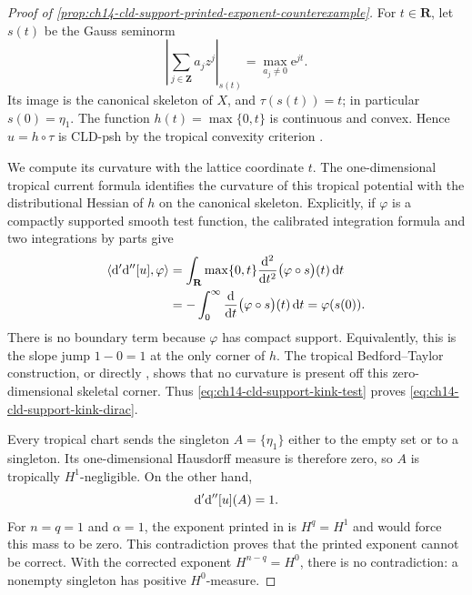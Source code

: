 \begin{proof}[Proof of
\cref{prop:ch14-cld-support-printed-exponent-counterexample}]
For $t\in\mathbf R$, let $s(t)$ be the Gauss seminorm
\[
 \left|\sum_{j\in\mathbf Z}a_jz^j\right|_{s(t)}
       =\max_{a_j\ne0}\mathrm e^{jt}.
\]
Its image is the canonical skeleton of $X$, and
$\tau(s(t))=t$; in particular $s(0)=\eta_1$.  The function
$h(t)=\max\{0,t\}$ is continuous and convex.  Hence
$u=h\circ\tau$ is CLD-psh by the tropical convexity criterion
\cite[Proposition~8.2.5]{CLD25}.

We compute its curvature with the lattice coordinate $t$.  The
one-dimensional tropical current formula identifies the curvature of this
tropical potential with the distributional Hessian of $h$ on the canonical
skeleton.  Explicitly, if $\varphi$ is a compactly supported smooth test
function, the calibrated integration formula and two integrations by parts
give
\begin{align}
 \left\langle\mathrm d'\mathrm d''[u],\varphi\right\rangle
   &=\int_{\mathbf R}\max\{0,t\}
           \frac{\mathrm d^2}{\mathrm dt^2}
             \bigl(\varphi\circ s\bigr)(t)\,\mathrm dt \notag\\
   &=-\int_0^\infty
           \frac{\mathrm d}{\mathrm dt}
             \bigl(\varphi\circ s\bigr)(t)\,\mathrm dt
     =\varphi(s(0)).
\label{eq:ch14-cld-support-kink-test}
\end{align}
There is no boundary term because $\varphi$ has compact support.  Equivalently,
this is the slope jump $1-0=1$ at the only corner of $h$.  The tropical
Bedford--Taylor construction, or directly
\cite[Theorem~8.10.3]{CLD25}, shows that no curvature is present off this
zero-dimensional skeletal corner.  Thus
\eqref{eq:ch14-cld-support-kink-test} proves
\eqref{eq:ch14-cld-support-kink-dirac}.

Every tropical chart sends the singleton $A=\{\eta_1\}$ either to the empty
set or to a singleton.  Its one-dimensional Hausdorff measure is therefore
zero, so $A$ is tropically $H^1$-negligible.  On the other hand,
\[
                    \mathrm d'\mathrm d''[u](A)=1.
\]
For $n=q=1$ and $\alpha=1$, the exponent printed in
\cite[Corollary~16.8.6]{CLD25} is $H^q=H^1$ and would force this mass to be
zero.  This contradiction proves that the printed exponent cannot be
correct.  With the corrected exponent $H^{n-q}=H^0$, there is no
contradiction: a nonempty singleton has positive $H^0$-measure.
\end{proof}
